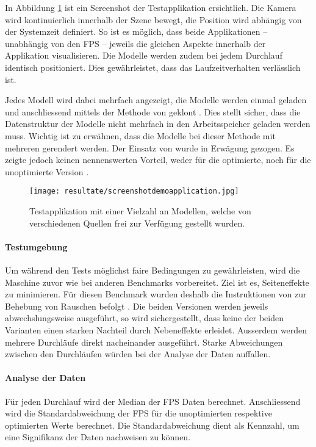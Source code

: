 In Abbildung \ref{fig:demoApplication} ist ein Screenshot der Testapplikation ersichtlich. Die Kamera wird kontinuierlich innerhalb der Szene bewegt, die Position wird abhängig von der Systemzeit definiert. So ist es möglich, dass beide Applikationen – unabhängig von den \gls{FPS} – jeweils die gleichen Aspekte innerhalb der Applikation visualisieren. Die Modelle werden zudem bei jedem Durchlauf identisch positioniert. Dies gewährleistet, dass das Laufzeitverhalten verlässlich ist.

Jedes Modell wird dabei mehrfach angezeigt, die Modelle werden einmal geladen und anschliessend mittels der  Methode von  geklont \cite{threeObject3DClone}. Dies stellt sicher, dass die Datenstruktur der Modelle nicht mehrfach in den Arbeitsspeicher geladen werden muss. Wichtig ist zu erwähnen, dass die Modelle bei dieser Methode mit mehreren  gerendert werden. Der Einsatz von  wurde in Erwägung gezogen. Es zeigte jedoch keinen nennenswerten Vorteil, weder für die optimierte, noch für die unoptimierte Version \cite{threeInstancedMesh}.

\begin{figure}[H]
  \centering
  \texttt{[image: resultate/screenshotdemoapplication.jpg]}
  \caption{Testapplikation mit einer Vielzahl an Modellen, welche von verschiedenen Quellen frei zur Verfügung gestellt wurden.}
  \label{fig:demoApplication}
\end{figure}

\paragraph{Testumgebung}
Um während den Tests möglichst faire Bedingungen zu gewährleisten, wird die Maschine zuvor wie bei anderen Benchmarks vorbereitet. Ziel ist es, Seiteneffekte zu minimieren. Für diesen Benchmark wurden deshalb die Instruktionen von  zur Behebung von Rauschen befolgt \cite{tracerBenchNoiseMitigation}. Die beiden Versionen werden jeweils abwechslungsweise ausgeführt, so wird sichergestellt, dass keine der beiden Varianten einen starken Nachteil durch Nebeneffekte erleidet. Ausserdem werden mehrere Durchläufe direkt nacheinander ausgeführt. Starke Abweichungen zwischen den Durchläufen würden bei der Analyse der Daten auffallen.

\pagebreak

\paragraph{Analyse der Daten}
Für jeden Durchlauf wird der Median der \gls{FPS} Daten berechnet.
Anschliessend wird die Standardabweichung der \gls{FPS} für die unoptimierten respektive optimierten Werte berechnet. Die Standardabweichung dient als Kennzahl, um eine Signifikanz der Daten nachweisen zu können.

